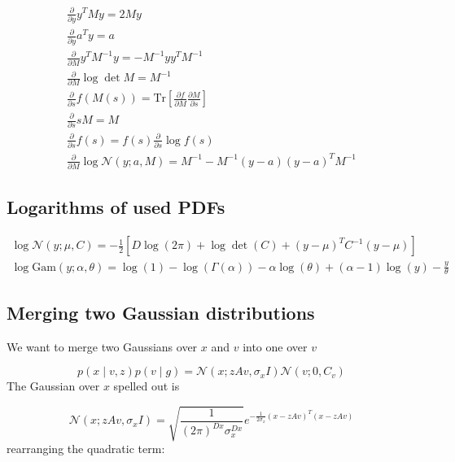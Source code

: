 \documentclass{paper}
\begin{document}
\begin{eqnarray}
\frac{\partial}{\partial y} y^T M y = 2 M y \label{eq:deriv_quadratic} \\
\frac{\partial}{\partial y} a^T y = a \label{eq:deriv_scalarprod} \\
\frac{\partial}{\partial M} y^T M^{-1} y = - M^{-1} yy^T M^{-1} \label{eq:deriv_quad_mat} \\
\frac{\partial}{\partial M} \log \det M = M^{-1} \label{eq:deriv_logdet} \\
\frac{\partial}{\partial s} f(M(s)) = \textrm{Tr} \left[ \frac{\partial f}{\partial M} \frac{\partial M}{\partial s} \right] \label{eq:deriv_chain} \\
\frac{\partial}{\partial s} s M = M \label{eq:deriv_scalar} \\
\frac{\partial}{\partial s} f(s) = f(s) \frac{\partial}{\partial s} \log f(s) \label{eq:deriv_function} \\
\frac{\partial}{\partial M} \log \mathcal{N}(y;a,M) = M^{-1} - M^{-1}(y-a)(y-a)^TM^{-1} \label{eq:deriv_gausscov}
\end{eqnarray}


\subsection{Logarithms of used PDFs} \label{sec:logpdf}

\begin{eqnarray}
\log  \mathcal{N}(y;\mu,C) = -\frac{1}{2} \left[D \log (2\pi) + \log \det (C) + (y - \mu)^T C^{-1} (y-\mu) \right] \\
\log  \textrm{Gam}(y;\alpha,\theta) = \log(1) - \log(\Gamma(\alpha)) - \alpha \log(\theta) + (\alpha-1) \log(y) - \frac{y}{\theta}
\end{eqnarray}

\subsection{Merging two Gaussian distributions} \label{sec:mergegauss}

We want to merge two Gaussians over $x$ and $v$ into one over $v$

\begin{equation}
p(x \mid v,z) p(v \mid g) = \mathcal{N}(x;zAv,\sigma_x I) \mathcal{N}(v;0,C_v)
\end{equation}
%
The Gaussian over $x$ spelled out is

\begin{equation} 
\mathcal{N}(x;zAv,\sigma_x I) = \sqrt{\frac{1}{(2\pi)^{Dx} \sigma_x^{Dx}}}e^{-\frac{1}{2 \sigma_x} (x-zAv)^T(x-zAv)}
\end{equation}
%
rearranging the quadratic term:
\end{document}
